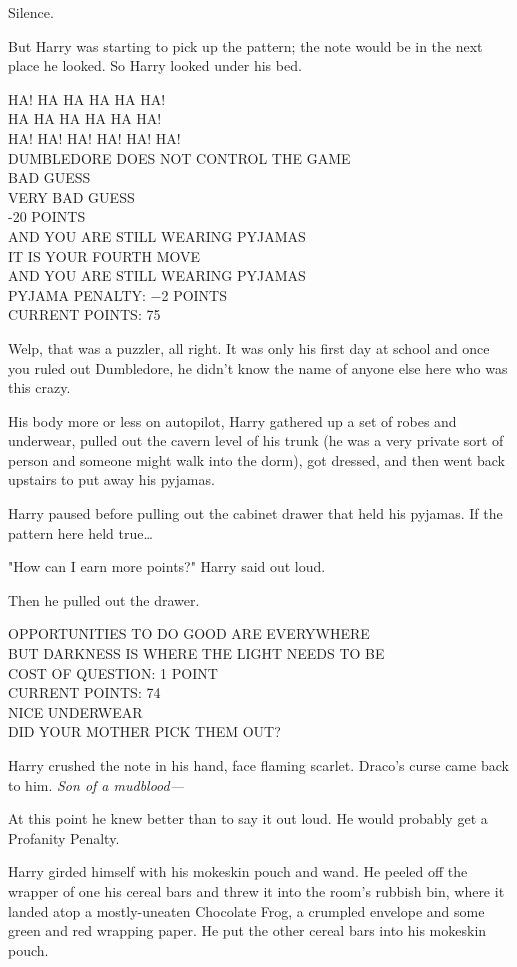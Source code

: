 Silence.

But Harry was starting to pick up the pattern; the note would be in the next 
place he looked. So Harry looked under his bed.

HA! HA HA HA HA HA!\\
HA HA HA HA HA HA!\\
HA! HA! HA! HA! HA! HA!\\
DUMBLEDORE DOES NOT CONTROL THE GAME\\
BAD GUESS\\
VERY BAD GUESS\\
-20 POINTS\\
AND YOU ARE STILL WEARING PYJAMAS\\
IT IS YOUR FOURTH MOVE\\
AND YOU ARE STILL WEARING PYJAMAS\\
PYJAMA PENALTY: $-$2 POINTS\\
CURRENT POINTS: 75

Welp, that was a puzzler, all right. It was only his first day at school and 
once you ruled out Dumbledore, he didn't know the name of anyone else here who 
was this crazy.

His body more or less on autopilot, Harry gathered up a set of robes and 
underwear, pulled out the cavern level of his trunk (he was a very private sort 
of person and someone might walk into the dorm), got dressed, and then went 
back upstairs to put away his pyjamas.

Harry paused before pulling out the cabinet drawer that held his pyjamas. If 
the pattern here held true{\ldots}

"How can I earn more points?" Harry said out loud.

Then he pulled out the drawer.

OPPORTUNITIES TO DO GOOD ARE EVERYWHERE\\
BUT DARKNESS IS WHERE THE LIGHT NEEDS TO BE\\
COST OF QUESTION: 1 POINT\\
CURRENT POINTS: 74\\
NICE UNDERWEAR\\
DID YOUR MOTHER PICK THEM OUT?

Harry crushed the note in his hand, face flaming scarlet. Draco's curse came 
back to him. \emph{Son of a mudblood---}

At this point he knew better than to say it out loud. He would probably get a 
Profanity Penalty.

Harry girded himself with his mokeskin pouch and wand. He peeled off the 
wrapper of one his cereal bars and threw it into the room's rubbish bin, where 
it landed atop a mostly-uneaten Chocolate Frog, a crumpled envelope and some 
green and red wrapping paper. He put the other cereal bars into his mokeskin 
pouch.

